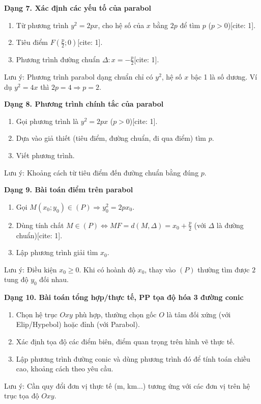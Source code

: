 \textbf{Dạng 7. Xác định các yếu tố của parabol}
\begin{enumerate}
\item Từ phương trình $y^2 = 2px$, cho hệ số của $x$ bằng $2p$ để tìm $p$ ($p > 0$)[cite: 1].
\item Tiêu điểm $F\left(\frac{p}{2}; 0\right)$[cite: 1].
\item Phương trình đường chuẩn $\Delta: x = -\frac{p}{2}$[cite: 1].
\end{enumerate}
Lưu ý: Phương trình parabol dạng chuẩn chỉ có $y^2$, hệ số $x$ bậc 1 là số dương. Ví dụ $y^2 = 4x$ thì $2p = 4 \Rightarrow p = 2$.

\textbf{Dạng 8. Phương trình chính tắc của parabol}
\begin{enumerate}
\item Gọi phương trình là $y^2 = 2px$ ($p > 0$)[cite: 1].
\item Dựa vào giả thiết (tiêu điểm, đường chuẩn, đi qua điểm) tìm $p$.
\item Viết phương trình.
\end{enumerate}
Lưu ý: Khoảng cách từ tiêu điểm đến đường chuẩn bằng đúng $p$.

\textbf{Dạng 9. Bài toán điểm trên parabol}
\begin{enumerate}
\item Gọi $M(x_0; y_0) \in (P) \Rightarrow y_0^2 = 2px_0$.
\item Dùng tính chất $M \in (P) \Leftrightarrow MF = d(M, \Delta) = x_0 + \frac{p}{2}$ (với $\Delta$ là đường chuẩn)[cite: 1].
\item Lập phương trình giải tìm $x_0$.
\end{enumerate}
Lưu ý: Điều kiện $x_0 \ge 0$. Khi có hoành độ $x_0$, thay vào $(P)$ thường tìm được $2$ tung độ $y_0$ đối nhau.

\textbf{Dạng 10. Bài toán tổng hợp/thực tế, PP tọa độ hóa 3 đường conic}
\begin{enumerate}
\item Chọn hệ trục $Oxy$ phù hợp, thường chọn gốc $O$ là tâm đối xứng (với Elip/Hypebol) hoặc đỉnh (với Parabol).
\item Xác định tọa độ các điểm biên, điểm quan trọng trên hình vẽ thực tế.
\item Lập phương trình đường conic và dùng phương trình đó để tính toán chiều cao, khoảng cách theo yêu cầu.
\end{enumerate}
Lưu ý: Cần quy đổi đơn vị thực tế (m, km...) tương ứng với các đơn vị trên hệ trục tọa độ $Oxy$.
